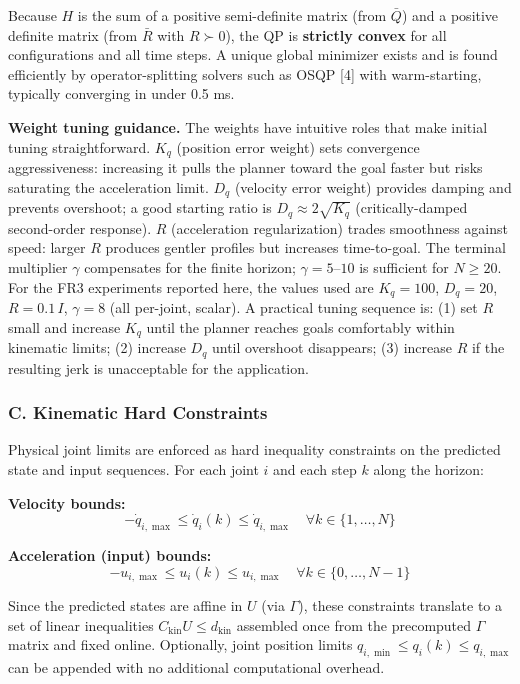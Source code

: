 Because \(H\) is the sum of a positive semi-definite matrix (from
\(\bar{Q}\)) and a positive definite matrix (from \(\bar{R}\) with
\(R \succ 0\)), the QP is \textbf{strictly convex} for all
configurations and all time steps. A unique global minimizer exists and
is found efficiently by operator-splitting solvers such as OSQP {[}4{]}
with warm-starting, typically converging in under 0.5 ms.

\textbf{Weight tuning guidance.} The weights have intuitive roles that
make initial tuning straightforward. \(K_q\) (position error weight)
sets convergence aggressiveness: increasing it pulls the planner toward
the goal faster but risks saturating the acceleration limit. \(D_q\)
(velocity error weight) provides damping and prevents overshoot; a good
starting ratio is \(D_q \approx 2\sqrt{K_q}\) (critically-damped
second-order response). \(R\) (acceleration regularization) trades
smoothness against speed: larger \(R\) produces gentler profiles but
increases time-to-goal. The terminal multiplier \(\gamma\) compensates
for the finite horizon; \(\gamma = 5\)--\(10\) is sufficient for
\(N \geq 20\). For the FR3 experiments reported here, the values used
are \(K_q = 100\), \(D_q = 20\), \(R = 0.1\,I\), \(\gamma = 8\) (all
per-joint, scalar). A practical tuning sequence is: (1) set \(R\) small
and increase \(K_q\) until the planner reaches goals comfortably within
kinematic limits; (2) increase \(D_q\) until overshoot disappears; (3)
increase \(R\) if the resulting jerk is unacceptable for the
application.

\subsubsection{C. Kinematic Hard
Constraints}\label{c.-kinematic-hard-constraints}

Physical joint limits are enforced as hard inequality constraints on the
predicted state and input sequences. For each joint \(i\) and each step
\(k\) along the horizon:

\textbf{Velocity bounds:}
\[-\dot{q}_{i,\max} \leq \dot{q}_{i}(k) \leq \dot{q}_{i,\max} \quad \forall k \in \{1,\dots,N\}\]

\textbf{Acceleration (input) bounds:}
\[-u_{i,\max} \leq u_i(k) \leq u_{i,\max} \quad \forall k \in \{0,\dots,N-1\}\]

Since the predicted states are affine in \(U\) (via \(\Gamma\)), these
constraints translate to a set of linear inequalities
\(C_{\text{kin}} U \leq d_{\text{kin}}\) assembled once from the
precomputed \(\Gamma\) matrix and fixed online. Optionally, joint
position limits \(q_{i,\min} \leq q_i(k) \leq q_{i,\max}\) can be
appended with no additional computational overhead.

